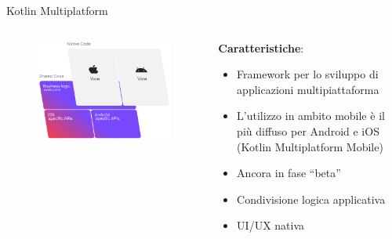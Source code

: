 \begin{frame}{Kotlin Multiplatform}
    \begin{columns}[onlytextwidth]
        \begin{column}{0.55\textwidth}
        
             \begin{figure}[H]
                \includegraphics[width=1\textwidth]{img/kmm-stack-official.png}
            \end{figure}
            
        \end{column}
        \begin{column}{0.45\textwidth}
        
            \textbf{Caratteristiche}:
            \begin{itemize}
                \item Framework per lo sviluppo di applicazioni multipiattaforma 
                \item L'utilizzo in ambito mobile è il più diffuso per Android e iOS (Kotlin Multiplatform Mobile)
                \item Ancora in fase ``beta''
                \item Condivisione logica applicativa
                \item UI/UX nativa
            \end{itemize}
            
        \end{column}
    \end{columns}
\end{frame}

